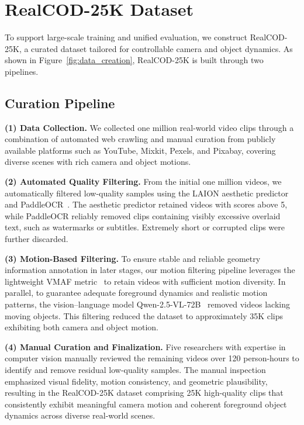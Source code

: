 \section{RealCOD-25K Dataset}
\label{sec:RealCOD-25K}

To support large-scale training and unified evaluation, we construct RealCOD-25K, a curated dataset tailored for controllable camera and object dynamics. As shown in Figure~\ref{fig:data_creation}, RealCOD-25K is built through two pipelines.

\subsection{Curation Pipeline}

\noindent\textbf{(1) Data Collection.}
We collected one million real-world video clips through a combination of automated web crawling and manual curation from publicly available platforms such as YouTube, Mixkit, Pexels, and Pixabay, covering diverse scenes with rich camera and object motions.

\noindent\textbf{(2) Automated Quality Filtering.}
From the initial one million videos, we automatically filtered low-quality samples using the LAION aesthetic predictor and PaddleOCR~\cite{liao2022real}.
The aesthetic predictor retained videos with scores above 5, while PaddleOCR reliably removed clips containing visibly excessive overlaid text, such as watermarks or subtitles. Extremely short or corrupted clips were further discarded.

\noindent\textbf{(3) Motion-Based Filtering.}
To ensure stable and reliable geometry information annotation in later stages, our motion filtering pipeline leverages the lightweight VMAF metric~\cite{li2016toward} to retain videos with sufficient motion diversity. In parallel, to guarantee adequate foreground dynamics and realistic motion patterns, the vision–language model Qwen-2.5-VL-72B~\cite{bai2025qwen2} removed videos lacking moving objects. This filtering reduced the dataset to approximately 35K clips exhibiting both camera and object motion.

\noindent\textbf{(4) Manual Curation and Finalization.}
Five researchers with expertise in computer vision manually reviewed the remaining videos over 120 person-hours to identify and remove residual low-quality samples. The manual inspection emphasized visual fidelity, motion consistency, and geometric plausibility, resulting in the RealCOD-25K dataset comprising 25K high-quality clips that consistently exhibit meaningful camera motion and coherent foreground object dynamics across diverse real-world scenes.

